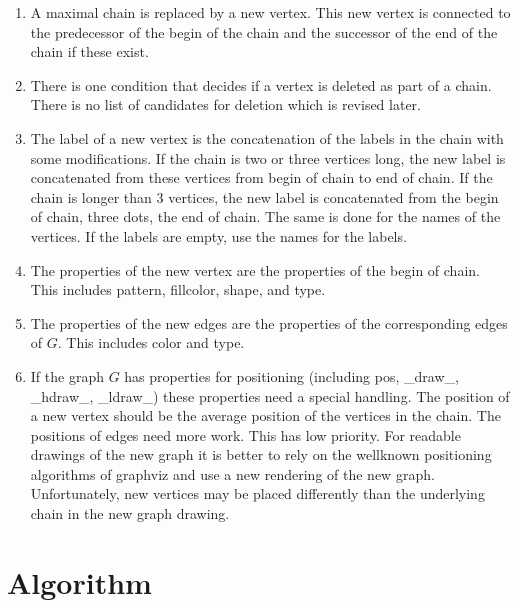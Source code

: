 \documentclass[12pt,a4paper]{report}
\begin{document}
\begin{enumerate}
\item A maximal chain is replaced by a new vertex. This new vertex is connected to the 
predecessor of the begin of the chain and the successor of the end of the chain if these exist.

\item There is one condition that decides if a vertex is deleted as part of a chain.
There is no list of candidates for deletion which is revised later. 

\item The label of a new vertex is the concatenation of the labels in the chain with some
modifications. If the chain is two or three vertices long, the new label is concatenated 
from these vertices from begin of chain to end of chain. If the chain is longer than 3
vertices, the new label is concatenated from the begin of chain, three dots, the end of chain.
The same is done for the names of the vertices. If the labels are empty, use the names for 
the labels.

\item The properties of the new vertex are the properties of the begin of chain. This
includes pattern, fillcolor, shape, and type.

\item The properties of the new edges are the properties of the corresponding edges
of $G$. This includes color and type.

\item If the graph $G$ has properties for positioning (including pos, \_draw\_, \_hdraw\_, \_ldraw\_)
these properties need a special handling. The position of a new vertex should be the average 
position of the vertices in the chain. The positions of edges need more work. This has low priority.
For readable drawings of the new graph it is better to rely on the wellknown positioning 
algorithms of graphviz and use a new rendering of the new graph. Unfortunately, new vertices 
may be placed differently than the underlying chain in the new graph drawing.

\end{enumerate}

\chapter{Algorithm}
\end{document}
